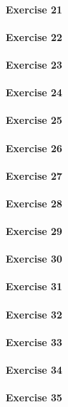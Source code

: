 \paragraph{Exercise 21}
\paragraph{Exercise 22}
\paragraph{Exercise 23}
\paragraph{Exercise 24}
\paragraph{Exercise 25}
\paragraph{Exercise 26}
\paragraph{Exercise 27}
\paragraph{Exercise 28}
\paragraph{Exercise 29}
\paragraph{Exercise 30}
\paragraph{Exercise 31}
\paragraph{Exercise 32}
\paragraph{Exercise 33}
\paragraph{Exercise 34}
\paragraph{Exercise 35}
